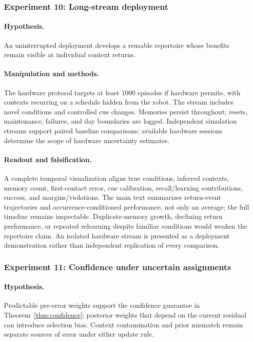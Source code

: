 \subsubsection{Experiment 10: Long-stream deployment}
\paragraph{Hypothesis.}
An uninterrupted deployment develops a reusable repertoire whose benefits remain visible at individual context returns.

\paragraph{Manipulation and methods.}
The hardware protocol targets at least $1000$ episodes if hardware permits, with contexts recurring on a schedule hidden from the robot. The stream includes novel conditions and controlled cue changes. Memories persist throughout; resets, maintenance, failures, and day boundaries are logged. Independent simulation streams support paired baseline comparisons; available hardware sessions determine the scope of hardware uncertainty estimates.

\paragraph{Readout and falsification.}
A complete temporal visualization aligns true conditions, inferred contexts, memory count, first-contact error, cue calibration, recall/learning contributions, success, and margins/violations. The main text summarizes return-event trajectories and occurrence-conditioned performance, not only an average; the full timeline remains inspectable. Duplicate-memory growth, declining return performance, or repeated relearning despite familiar conditions would weaken the repertoire claim. An isolated hardware stream is presented as a deployment demonstration rather than independent replication of every comparison.

\subsubsection{Experiment 11: Confidence under uncertain assignments}
\paragraph{Hypothesis.}
Predictable pre-error weights support the confidence guarantee in Theorem~\ref{thm:confidence}; posterior weights that depend on the current residual can introduce selection bias. Context contamination and prior mismatch remain separate sources of error under either update rule.

